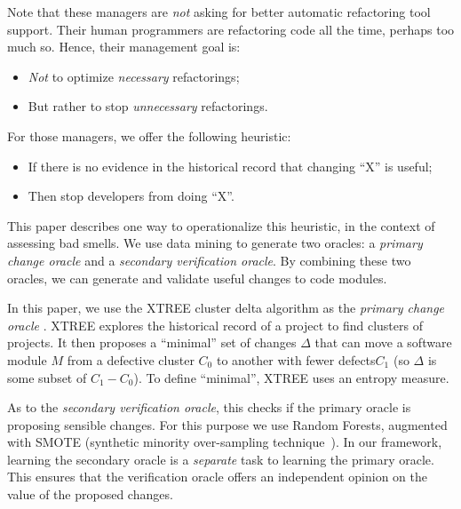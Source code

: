 \documentclass[twocolumn,5p]{elsarticle}
\newcommand{\bi}{\begin{itemize}[leftmargin=0.4cm]}
\newcommand{\ei}{\end{itemize}}
\theoremstyle{break}
\begin{document}
Note that these managers are {\em not} asking for better
automatic refactoring
tool support. Their human programmers are refactoring
code all the time, perhaps too much so.
Hence, their management goal is: 
\bi
\item
{\em Not} to optimize {\em necessary} refactorings;
\item
But rather to stop {\em unnecessary} refactorings.
\ei
For those managers, we offer the  following heuristic:
\bi
\item If there is no evidence in the historical record that changing ``X'' is useful;
\item Then stop developers from doing ``X''.
\ei
This paper describes one way to operationalize this heuristic, in the context
of assessing bad smells. We use data mining to generate two oracles: a {\em primary
change oracle} and a {\em secondary verification oracle}.
By combining these two oracles,
 we can generate and validate useful
changes to code modules.

In this paper, we use 
the XTREE cluster delta algorithm as the {\em primary change  oracle} .
XTREE 
explores the historical record of a project to find clusters of projects.
It then proposes a ``minimal'' set of changes $\Delta$ that can move a software module $M$ from a defective cluster $C_0$ to another with fewer defects$C_1$ (so $\Delta$
is some subset of $C_1 - C_0$). To define ``minimal'', XTREE uses an entropy measure.

As to 
the {\em secondary verification oracle}, this  checks if the primary oracle is proposing
sensible changes. For this purpose we  use Random Forests\cite{XXX}, augmented with SMOTE (synthetic  minority over-sampling technique~\cite{YYY}).
 In our framework,  learning
the secondary oracle is   a {\em separate} task to learning the primary
oracle. This  ensures that the verification oracle offers an independent
opinion on the value of the proposed changes.
\end{document}
